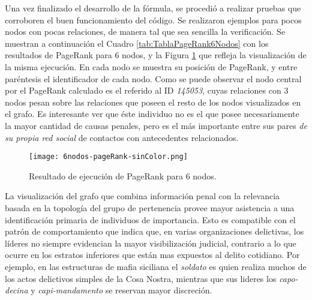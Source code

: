 Una vez finalizado el desarrollo de la fórmula, se procedió a realizar pruebas que corroboren el buen funcionamiento del código. Se realizaron ejemplos para pocos nodos con pocas relaciones, de manera tal que sea sencilla la verificación. Se muestran a continuación el Cuadro \ref{tab:TablaPageRank6Nodos} con los resultados de PageRank para 6 nodos, y la Figura \ref{fig:6nodos-pageRank-sinColor} que refleja la visualización de la misma ejecución. En cada nodo se muestra su posición de PageRank, y entre paréntesis el identificador de cada nodo. Como se puede observar el nodo central por el PageRank calculado es el referido al ID \textit{145053}, cuyas relaciones con 3 nodos pesan sobre las relaciones que poseen el resto de los nodos visualizados en el grafo.
Es interesante ver que éste individuo no es el que posee necesariamente la mayor cantidad de causas penales, pero es el más importante entre sus pares \textit{de su propia red social} de contactos con antecedentes relacionados.
\begin{table}
\centering
{}
\vspace{10pt}
\caption{Valores de PageRank por nodo luego de la ejecución del algoritmo}
\end{table}
\begin{figure}
	\centering
	\texttt{[image: 6nodos-pageRank-sinColor.png]}
	\caption{Resultado de ejecución de PageRank para 6 nodos.} 
	\label{fig:6nodos-pageRank-sinColor}
\end{figure}

La visualización del grafo que combina información penal con la relevancia basada en la topología del grupo de pertenencia provee mayor asistencia a una identificación primaria de individuos de importancia.
Esto es compatible con el patrón de comportamiento que indica que, en varias organizaciones delictivas, los líderes no siempre evidencian la mayor visibilización judicial, contrario a lo que ocurre en los estratos inferiores que están mas expuestos al delito cotidiano. Por ejemplo, en las estructuras de mafia siciliana el \textit{soldato} es quien realiza muchos de los actos delictivos simples de la Cosa Nostra, mientras que sus lideres los \textit{capo-decina} y \textit{capi-mandamento} se reservan mayor discreción. 



